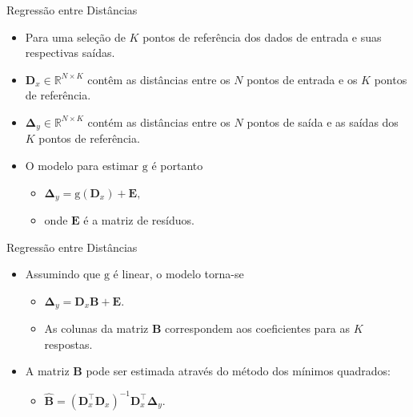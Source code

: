 \documentclass{beamer}
\begin{document}
\begin{frame}{Regressão entre Distâncias}

	\begin{itemize}
		\item Para uma seleção de $K$ pontos de referência dos dados de entrada e suas respectivas saídas.
		\item $ \mathbf{D}_x \in \mathbb{R}^{N \times K} $ contêm as distâncias entre os $N$ pontos de entrada e os $K$ pontos de referência.
		\item $\boldsymbol{\Delta}_y \in \mathbb{R}^{N \times K} $ contém as distâncias entre os $N$ pontos de saída e as saídas dos $K$ pontos de referência.
		\item O modelo para estimar $\mathrm{g} $ é portanto
			\begin{itemize}[]
				\item[] $\boldsymbol{\Delta}_y = \mathrm{g}(\mathbf{D}_x) + \mathbf{E},$
				\item[] onde $\mathbf{E} $ é a matriz de resíduos.
			\end{itemize}
	\end{itemize}
	

\end{frame}


\begin{frame}{Regressão entre Distâncias}

	\begin{itemize}
		\item Assumindo que $\mathrm{g} $ é linear, o modelo torna-se
			\begin{itemize}[]
				\item[] $ \boldsymbol{\Delta}_y = \mathbf{D}_x \mathbf{B} + \mathbf{E}. $
				\item[] As colunas da matriz $\mathbf{B}$ correspondem aos coeficientes para as $K$ respostas.
			\end{itemize}
		\item A matriz  $\mathbf{B}$ pode ser estimada através do método dos mínimos quadrados:
			\begin{itemize}[]
				\item[] $ \mathbf{\widehat{B}} = (\mathbf{D}_{x}^{\intercal}\mathbf{D}_x)^{-1}\mathbf{D}_{x}^{\intercal}\boldsymbol{\Delta}_y. $
			\end{itemize}
	\end{itemize}

\end{frame}
\end{document}
